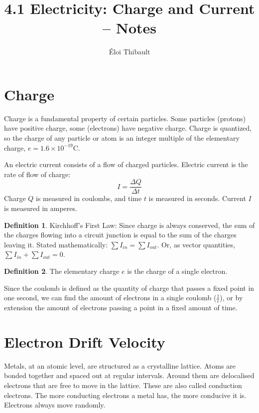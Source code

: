 \documentclass[11pt]{article}
\title{4.1 Electricity: Charge and Current – Notes}
\author{Éloi Thibault}
\begin{document}
\theoremstyle{definition}
\newtheorem{define}{Definition}[section]

\maketitle

\section{Charge}

Charge is a fundamental property of certain particles. Some particles (protons) have positive charge, some (electrons) have negative charge. Charge is quantized, so the charge of any particle or atom is an integer multiple of the elementary charge, $e = 1.6\times10^{-19}\si{\coulomb}$.

An electric current consists of a flow of charged particles. Electric current is the rate of flow of charge:
\[I=\frac{\Delta Q}{\Delta t}\]
Charge $Q$ is measured in coulombs, and time $t$ is measured in seconds. Current $I$ is measured in amperes.

\begin{define}
	Kirchhoff's First Law: Since charge is always conserved, the sum of the charges flowing into a circuit junction is equal to the sum of the charges leaving it. Stated mathematically: $\sum{I_{in}} = \sum{I_{out}}$. Or, as vector quantities, $\sum{I_{in}} + \sum{I_{out}} = 0$.
\end{define}

\begin{define}
	The elementary charge $e$ is the charge of a single electron.
\end{define}

Since the coulomb is defined as the quantity of charge that passes a fixed point in one second, we can find the amount of electrons in a single coulomb ($\frac{1}{e}$), or by extension the amount of electrons passing a point in a fixed amount of time. 

\section{Electron Drift Velocity}

Metals, at an atomic level, are structured as a crystalline lattice. Atoms are bonded together and spaced out at regular intervals. Around them are delocalised electrons that are free to move in the lattice. These are also called conduction electrons. The more conducting electrons a metal has, the more conducive it is. Electrons always move randomly.
\end{document}
